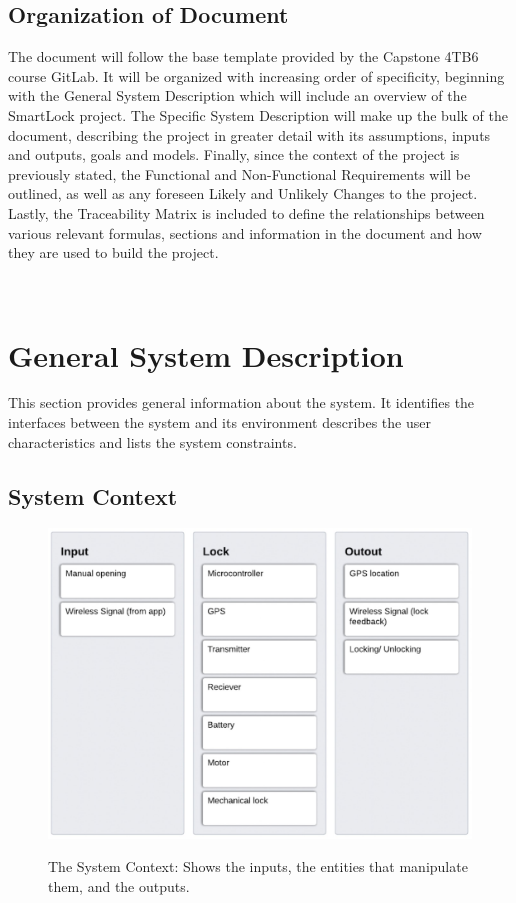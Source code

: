 \documentclass[12pt]{article}
\begin{document}
\subsection{Organization of Document}

The document will follow the base template provided by the Capstone 4TB6 course GitLab. It will be organized with increasing order of specificity, beginning with the General System Description which will include an overview of the SmartLock project. The Specific System Description will make up the bulk of the document, describing the project in greater detail with its assumptions, inputs and outputs, goals and models. Finally, since the context of the project is previously stated, the Functional and Non-Functional Requirements will be outlined, as well as any foreseen Likely and Unlikely Changes to the project. Lastly, the Traceability Matrix is included to define the relationships between various relevant formulas, sections and information in the document and how they are used to build the project.  

~\newpage

\section{General System Description}

This section provides general information about the system. It identifies the interfaces between the system and its environment describes the user characteristics and lists the system constraints.  

\subsection{System Context}

 \begin{figure}[h!]
 \begin{center}
 {
  \includegraphics[width=0.6\linewidth]{../SystemContextDiagram.jpeg}
 }
 \caption{\label{The System Context}The System Context: Shows the inputs, the entities that manipulate them, and the outputs.}
 \end{center}
 \end{figure}
\end{document}
